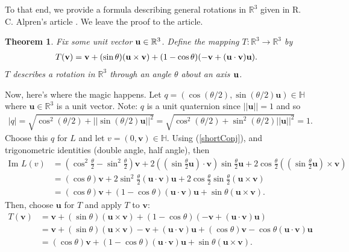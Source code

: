 \documentclass[12pt]{article}
\theoremstyle{plain}
\newtheorem{thm}{Theorem}[section]
\theoremstyle{definition}
\begin{document}
To that end, we provide a formula describing general rotations in $\mathbb{R}^3$ given in R. C. Alpren's article \cite{alperin}. We leave the proof to the article.
\begin{thm} \label{rotR3}
Fix some unit vector $\textbf{\textup{u}}\in\mathbb{R}^3$. Define the mapping $T:\mathbb{R}^3\to\mathbb{R}^3$ by 
\begin{align*}
    T(\textbf{\textup{v}}) = \textbf{\textup{v}} + (\sin\theta)(\textbf{\textup{u}}\times\textbf{\textup{v}}) + (1-\cos\theta)(-\textbf{\textup{v}}+(\textbf{\textup{u}}\cdot\textbf{\textup{v}})\textbf{\textup{u}}).
\end{align*}
$T$ describes a rotation in $\mathbb{R}^3$ through an angle $\theta$ about an axis $\textbf{\textup{u}}$.
\end{thm}
Now, here's where the magic happens. Let $q=(\cos(\theta/2),\sin(\theta/2)\textbf{u})\in\mathbb{H}$ where $\textbf{u}\in\mathbb{R}^3$ is a unit vector. Note: $q$ is a unit quaternion since $||\textbf{u}||=1$ and so
\begin{align*}
    |q|=\sqrt{\cos^2(\theta/2) + ||\sin(\theta/2)\textbf{u}||^2}=\sqrt{\cos^2(\theta/2) + \sin^2(\theta/2)||\textbf{u}||^2}= 1.
\end{align*}
Choose this $q$ for $L$ and let $v=(0,\textbf{v})\in\mathbb{H}$. Using (\ref{shortConj}), and trigonometric identities (double angle, half angle), then
\begin{align*}
    \text{Im } L(v) &= (\cos^2\frac{\theta}{2} - \sin^2\frac{\theta}{2})\textbf{v} + 2((\sin\frac{\theta}{2}\textbf{u})\cdot\textbf{v})\sin\frac{\theta}{2}\textbf{u} + 2\cos\frac{\theta}{2}((\sin\frac{\theta}{2}\textbf{u})\times\textbf{v}) \\ 
        &= (\cos\theta)\textbf{v} + 2\sin^2\frac{\theta}{2}(\textbf{u}\cdot\textbf{v})\textbf{u} + 2\cos\frac{\theta}{2}\sin\frac{\theta}{2}(\textbf{u}\times\textbf{v}) \\
        &= (\cos\theta)\textbf{v} + (1-\cos\theta)(\textbf{u}\cdot\textbf{v})\textbf{u} + \sin\theta(\textbf{u}\times\textbf{v}).
\end{align*}
Then, choose $\textbf{u}$ for $T$ and apply $T$ to $\textbf{v}$:
\begin{align*}
    T(\textbf{v}) &= \textbf{v} + (\sin\theta)(\textbf{u}\times\textbf{v}) + (1-\cos\theta)(-\textbf{v}+(\textbf{u}\cdot\textbf{v})\textbf{u}) \\
    &= \textbf{v} + (\sin\theta)(\textbf{u}\times\textbf{v}) -\textbf{v}+(\textbf{u}\cdot\textbf{v})\textbf{u} +
    (\cos\theta)\textbf{v}-\cos\theta(\textbf{u}\cdot\textbf{v})\textbf{u} \\
    &= (\cos\theta)\textbf{v} + (1-\cos\theta)(\textbf{u}\cdot\textbf{v})\textbf{u} + \sin\theta(\textbf{u}\times\textbf{v}).
\end{align*}
\end{document}
